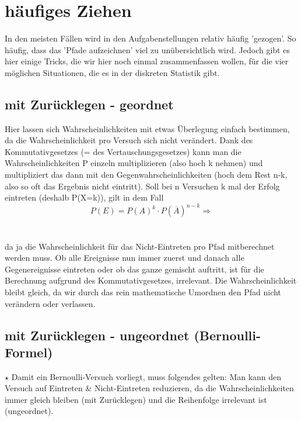 \section{häufiges Ziehen}
	In den meisten Fällen wird in den Aufgabenstellungen relativ häufig 'gezogen'.
	So häufig, dass das 'Pfade aufzeichnen' viel zu unübersichtlich wird. Jedoch
	gibt es hier einige Tricks, die wir hier noch einmal zusammenfassen wollen, für
	die vier möglichen Situationen, die es in der diskreten Statistik gibt.

	\subsection{mit Zurücklegen - geordnet}
		Hier lassen sich Wahrscheinlichkeiten mit etwas Überlegung einfach bestimmen,
		da die Wahrscheinlichkeit pro Versuch sich nicht verändert. Dank des
		Kommutativgesetzes (= des Vertauschungsgesetzes) kann man die
		Wahrscheinlichkeiten P einzeln multiplizieren (also hoch k nehmen) und
		multipliziert das dann mit den Gegenwahrscheinlichkeiten (hoch dem Rest n-k,
		also so oft das Ergebnis nicht eintritt). Soll bei n Versuchen k mal der
		Erfolg eintreten (deshalb P(X=k)), gilt in dem Fall
		\[P(E)=P(A)^k\cdot P(\overline{A})^{n-k} \Rightarrow\]
		\formel{\[P(X=k)=p^k\cdot(1-p)^{n-k}\]}
		\\ \\
		da ja die Wahrscheinlichkeit für das Nicht-Eintreten pro Pfad mitberechnet
		werden muss. Ob alle Ereignisse nun immer zuerst und danach alle
		Gegenereignisse eintreten oder ob das ganze gemischt auftritt, ist für die
		Berechnung aufgrund des Kommutativgesetzes, irrelevant. Die Wahrscheinlichkeit
		bleibt gleich, da wir durch das rein mathematische Umordnen den Pfad nicht
		verändern oder verlassen.

	\subsection{mit Zurücklegen - ungeordnet (Bernoulli-Formel)}
		\(\star\) Damit ein Bernoulli-Versuch vorliegt, muss folgendes gelten: Man
		kann den Versuch auf Eintreten \& Nicht-Eintreten reduzieren, da die
		Wahrscheinlichkeiten immer gleich bleiben (mit Zurücklegen) und die
		Reihenfolge irrelevant ist (ungeordnet).\\
		
